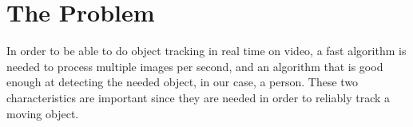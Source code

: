 \section{The Problem}
In order to be able to do object tracking in real time on video, a fast algorithm is needed to process multiple images per second, and an algorithm that is good enough at detecting the needed object, in our case, a person. These two characteristics are important since they are needed in order to reliably track a moving object. 